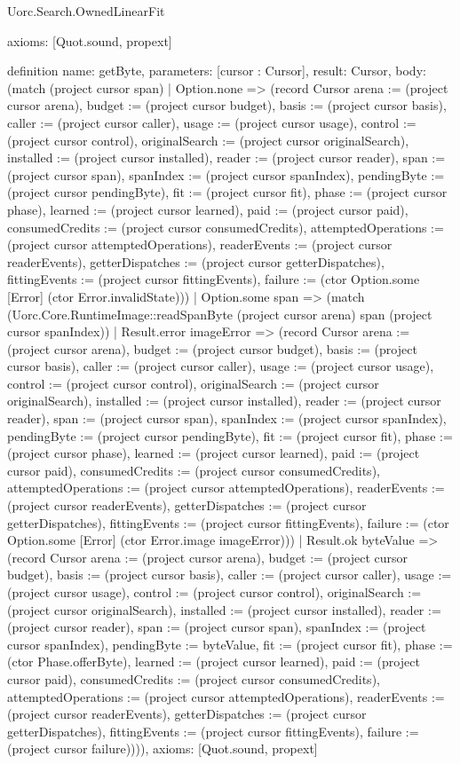 \begin{lexlean}{Uorc.Search.OwnedLinearFit}
\begin{semanticmodule}
{  axioms: [Quot.sound, propext]
}

definition{
  name: getByte,
  parameters: [cursor : Cursor],
  result: Cursor,
  body: (match (project cursor span)
    | Option.none => (record Cursor {arena := (project cursor arena), budget := (project cursor budget), basis := (project cursor basis), caller := (project cursor caller), usage := (project cursor usage), control := (project cursor control), originalSearch := (project cursor originalSearch), installed := (project cursor installed), reader := (project cursor reader), span := (project cursor span), spanIndex := (project cursor spanIndex), pendingByte := (project cursor pendingByte), fit := (project cursor fit), phase := (project cursor phase), learned := (project cursor learned), paid := (project cursor paid), consumedCredits := (project cursor consumedCredits), attemptedOperations := (project cursor attemptedOperations), readerEvents := (project cursor readerEvents), getterDispatches := (project cursor getterDispatches), fittingEvents := (project cursor fittingEvents), failure := (ctor Option.some [Error] (ctor Error.invalidState))})
    | Option.some span => (match (Uorc.Core.RuntimeImage::readSpanByte (project cursor arena) span (project cursor spanIndex))
      | Result.error imageError => (record Cursor {arena := (project cursor arena), budget := (project cursor budget), basis := (project cursor basis), caller := (project cursor caller), usage := (project cursor usage), control := (project cursor control), originalSearch := (project cursor originalSearch), installed := (project cursor installed), reader := (project cursor reader), span := (project cursor span), spanIndex := (project cursor spanIndex), pendingByte := (project cursor pendingByte), fit := (project cursor fit), phase := (project cursor phase), learned := (project cursor learned), paid := (project cursor paid), consumedCredits := (project cursor consumedCredits), attemptedOperations := (project cursor attemptedOperations), readerEvents := (project cursor readerEvents), getterDispatches := (project cursor getterDispatches), fittingEvents := (project cursor fittingEvents), failure := (ctor Option.some [Error] (ctor Error.image imageError))})
      | Result.ok byteValue => (record Cursor {arena := (project cursor arena), budget := (project cursor budget), basis := (project cursor basis), caller := (project cursor caller), usage := (project cursor usage), control := (project cursor control), originalSearch := (project cursor originalSearch), installed := (project cursor installed), reader := (project cursor reader), span := (project cursor span), spanIndex := (project cursor spanIndex), pendingByte := byteValue, fit := (project cursor fit), phase := (ctor Phase.offerByte), learned := (project cursor learned), paid := (project cursor paid), consumedCredits := (project cursor consumedCredits), attemptedOperations := (project cursor attemptedOperations), readerEvents := (project cursor readerEvents), getterDispatches := (project cursor getterDispatches), fittingEvents := (project cursor fittingEvents), failure := (project cursor failure)}))),
  axioms: [Quot.sound, propext]
}


\end{semanticmodule}
\end{lexlean}
